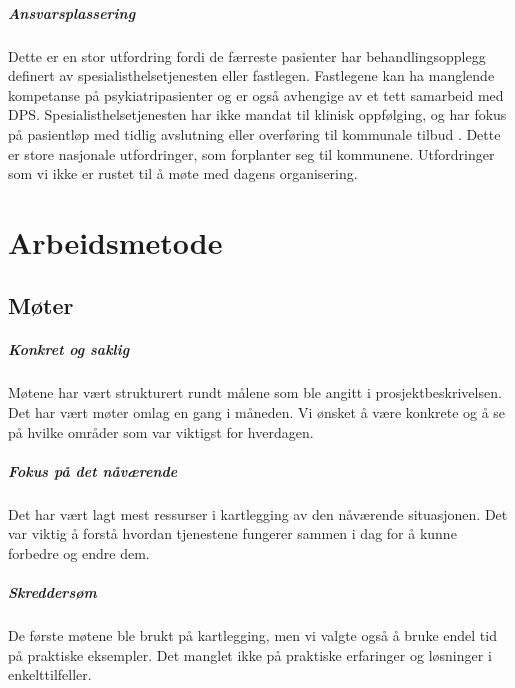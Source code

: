 \documentclass[11pt]{report} %
\begin{document}
                  \paragraph{Ansvarsplassering\\}
                    Dette er en stor utfordring fordi de færreste pasienter har behandlingsopplegg definert av spesialisthelsetjenesten eller fastlegen. Fastlegene kan ha manglende kompetanse på psykiatripasienter og er også avhengige av et tett samarbeid med DPS. Spesialisthelsetjenesten har ikke mandat til klinisk oppfølging, og har fokus på pasientløp med tidlig avslutning eller overføring til kommunale tilbud
                    \cite{HOTJL-12}.
                    Dette er store nasjonale utfordringer, som forplanter seg til kommunene. Utfordringer som vi ikke er rustet til å møte med dagens organisering. \\

                \chapter{Arbeidsmetode}\label{chap:meto}
                  \section{Møter}
                    \paragraph{Konkret og saklig\\}
                      Møtene har vært strukturert rundt målene som ble angitt i prosjektbeskrivelsen. Det har vært møter omlag en gang i måneden. Vi ønsket å være konkrete og å se på hvilke områder som var viktigst for hverdagen\cite{ProPlan-1}.
                    \paragraph{Fokus på det nåværende\\}
                      Det har vært lagt mest ressurser i kartlegging av den nåværende situasjonen. Det var viktig å forstå hvordan tjenestene fungerer sammen i dag for å kunne forbedre og endre dem.\\
                    \paragraph{Skreddersøm\\}
                      De første møtene ble brukt på kartlegging, men vi valgte også å bruke endel tid på praktiske eksempler. Det manglet ikke på praktiske erfaringer og løsninger i enkelttilfeller. 
\end{document}
